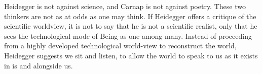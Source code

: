 \documentclass[leqno, 12pt]{turabian-researchpaper}
\begin{document}
	Heidegger is not against science, and Carnap is not against poetry. These two
	thinkers are not as at odds as one may think. If Heidegger offers a critique of
	the scientific worldview, it is not to say that he is not a scientific realist,
	only that he sees the technological mode of Being as one among many. Instead
	of proceeding from a highly developed technological world-view to reconstruct
	the world, Heidegger suggests we sit and listen, to allow the world to speak
	to us as it exists in is and alongside us.

	\printbibliography

	\centerline{}
\end{document}
